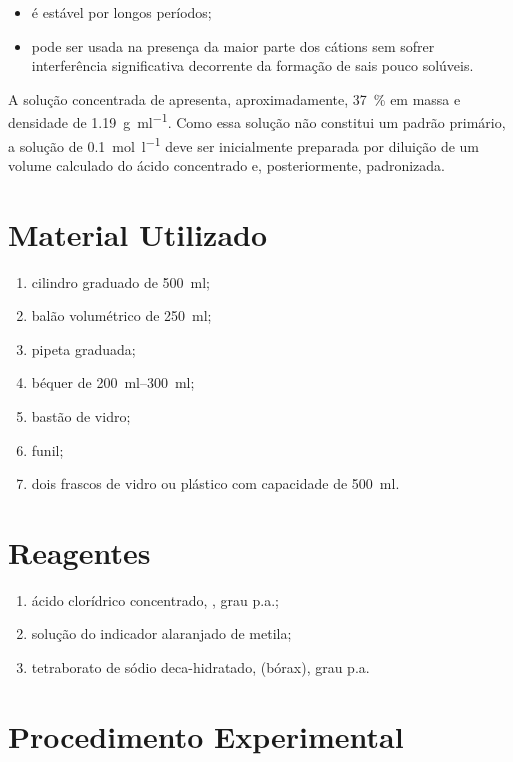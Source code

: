 \documentclass[a4paper,12pt]{article}
\begin{document}
\begin{itemize}
    \item é estável por longos períodos;
    \item pode ser usada na presença da maior parte dos cátions sem sofrer interferência significativa decorrente da formação de sais pouco solúveis.
\end{itemize}

A solução concentrada de  apresenta, aproximadamente, \qty{37}{\percent} em massa e densidade de \qty{1.19}{\gram\per\milli\litre}. Como essa solução não constitui um padrão primário, a solução de  \qty{0.1}{\mole\per\litre} deve ser inicialmente preparada por diluição de um volume calculado do ácido concentrado e, posteriormente, padronizada.

\section{Material Utilizado}

\begin{enumerate}[label=\alph*.]
    \item cilindro graduado de \qty{500}{\milli\litre};
    \item balão volumétrico de \qty{250}{\milli\litre};
    \item pipeta graduada;
    \item béquer de \qtyrange{200}{300}{\milli\litre};
    \item bastão de vidro;
    \item funil;
    \item dois frascos de vidro ou plástico com capacidade de \qty{500}{\milli\litre}.
\end{enumerate}

\section{Reagentes}

\begin{enumerate}[label=\alph*.]
    \item ácido clorídrico concentrado, , grau p.a.;
    \item solução do indicador alaranjado de metila;
    \item tetraborato de sódio deca-hidratado,  (bórax), grau p.a.
\end{enumerate}

\section{Procedimento Experimental}
\end{document}
